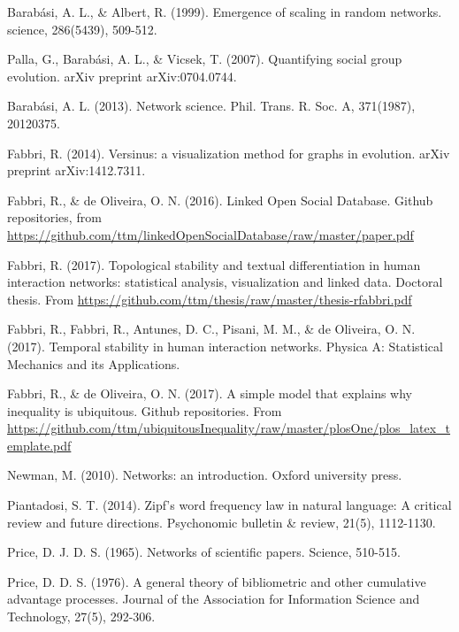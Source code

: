 \documentclass[12pt,fleqn]{article}
\begin{document}
\begin{thebibliography}{99}
\fontsize{11}{0}\selectfont
{}
Barabási, A. L., \& Albert, R. (1999). Emergence of scaling in random networks. science, 286(5439), 509-512.

Palla, G., Barabási, A. L., \& Vicsek, T. (2007). Quantifying social group evolution. arXiv preprint arXiv:0704.0744.
 
Barabási, A. L. (2013). Network science. Phil. Trans. R. Soc. A, 371(1987), 20120375.

Fabbri, R. (2014). Versinus: a visualization method for graphs in evolution. arXiv preprint arXiv:1412.7311.

	Fabbri, R., \& de Oliveira, O. N. (2016). Linked Open Social Database. Github repositories, from \url{https://github.com/ttm/linkedOpenSocialDatabase/raw/master/paper.pdf}

Fabbri, R. (2017). Topological stability and textual differentiation in human interaction networks:
		statistical analysis, visualization and linked data. Doctoral thesis.
		From \url{https://github.com/ttm/thesis/raw/master/thesis-rfabbri.pdf}

Fabbri, R., Fabbri, R., Antunes, D. C., Pisani, M. M., \& de Oliveira, O. N. (2017). Temporal stability in human interaction networks. Physica A: Statistical Mechanics and its Applications.

Fabbri, R., \& de Oliveira, O. N. (2017). A simple model that explains why inequality is ubiquitous. Github repositories.
		From \url{https://github.com/ttm/ubiquitousInequality/raw/master/plosOne/plos_latex_template.pdf}

Newman, M. (2010). Networks: an introduction. Oxford university press.

Piantadosi, S. T. (2014). Zipf’s word frequency law in natural language: A critical review and future directions. Psychonomic bulletin \& review, 21(5), 1112-1130.

Price, D. J. D. S. (1965). Networks of scientific papers. Science, 510-515.

Price, D. D. S. (1976). A general theory of bibliometric and other cumulative advantage processes. Journal of the Association for Information Science and Technology, 27(5), 292-306.


\end{thebibliography}
\end{document}
